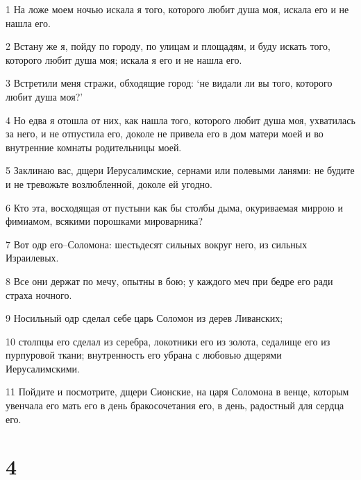 \par 1 На ложе моем ночью искала я того, которого любит душа моя, искала его и не нашла его.
\par 2 Встану же я, пойду по городу, по улицам и площадям, и буду искать того, которого любит душа моя; искала я его и не нашла его.
\par 3 Встретили меня стражи, обходящие город: `не видали ли вы того, которого любит душа моя?'
\par 4 Но едва я отошла от них, как нашла того, которого любит душа моя, ухватилась за него, и не отпустила его, доколе не привела его в дом матери моей и во внутренние комнаты родительницы моей.
\par 5 Заклинаю вас, дщери Иерусалимские, сернами или полевыми ланями: не будите и не тревожьте возлюбленной, доколе ей угодно.
\par 6 Кто эта, восходящая от пустыни как бы столбы дыма, окуриваемая миррою и фимиамом, всякими порошками мироварника?
\par 7 Вот одр его--Соломона: шестьдесят сильных вокруг него, из сильных Израилевых.
\par 8 Все они держат по мечу, опытны в бою; у каждого меч при бедре его ради страха ночного.
\par 9 Носильный одр сделал себе царь Соломон из дерев Ливанских;
\par 10 столпцы его сделал из серебра, локотники его из золота, седалище его из пурпуровой ткани; внутренность его убрана с любовью дщерями Иерусалимскими.
\par 11 Пойдите и посмотрите, дщери Сионские, на царя Соломона в венце, которым увенчала его мать его в день бракосочетания его, в день, радостный для сердца его.

\chapter{4}

